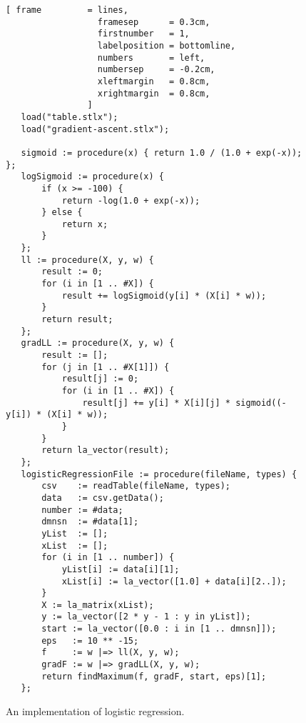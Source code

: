 \begin{figure}[!ht]
\centering
\begin{Verbatim}[ frame         = lines, 
                  framesep      = 0.3cm, 
                  firstnumber   = 1,
                  labelposition = bottomline,
                  numbers       = left,
                  numbersep     = -0.2cm,
                  xleftmargin   = 0.8cm,
                  xrightmargin  = 0.8cm,
                ]
   load("table.stlx");
   load("gradient-ascent.stlx");
   
   sigmoid := procedure(x) { return 1.0 / (1.0 + exp(-x)); };
   logSigmoid := procedure(x) {
       if (x >= -100) {
           return -log(1.0 + exp(-x));
       } else {  
           return x;
       }
   };
   ll := procedure(X, y, w) {
       result := 0;
       for (i in [1 .. #X]) {
           result += logSigmoid(y[i] * (X[i] * w));
       }
       return result;
   };   
   gradLL := procedure(X, y, w) {
       result := [];
       for (j in [1 .. #X[1]]) {
           result[j] := 0;
           for (i in [1 .. #X]) {
               result[j] += y[i] * X[i][j] * sigmoid((-y[i]) * (X[i] * w));
           }
       }
       return la_vector(result);
   };
   logisticRegressionFile := procedure(fileName, types) {
       csv    := readTable(fileName, types);
       data   := csv.getData();
       number := #data;
       dmnsn  := #data[1];    
       yList  := [];
       xList  := [];
       for (i in [1 .. number]) {
           yList[i] := data[i][1];
           xList[i] := la_vector([1.0] + data[i][2..]);
       }
       X := la_matrix(xList);
       y := la_vector([2 * y - 1 : y in yList]);
       start := la_vector([0.0 : i in [1 .. dmnsn]]);
       eps   := 10 ** -15;
       f     := w |=> ll(X, y, w);
       gradF := w |=> gradLL(X, y, w);
       return findMaximum(f, gradF, start, eps)[1];
   };
\end{Verbatim}
\vspace*{-0.3cm}
\caption{An implementation of logistic regression.}
\label{fig:logistic-regression.stlx}
\end{figure}

